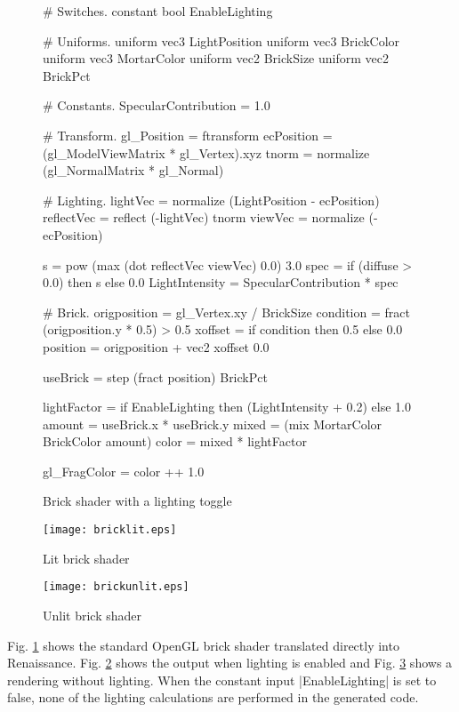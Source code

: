 \documentclass{acmsiggraph}               %
\begin{document}
\begin{figure}[htb]
\begin{MyVerb}
# Switches.
constant bool EnableLighting

# Uniforms.
uniform vec3 LightPosition
uniform vec3 BrickColor
uniform vec3 MortarColor
uniform vec2 BrickSize
uniform vec2 BrickPct

# Constants.
SpecularContribution = 1.0

# Transform.
gl_Position = ftransform
ecPosition = (gl_ModelViewMatrix * gl_Vertex).xyz
tnorm = normalize (gl_NormalMatrix * gl_Normal)

# Lighting.
lightVec   = normalize (LightPosition - ecPosition)
reflectVec = reflect (-lightVec) tnorm
viewVec    = normalize (-ecPosition)

s = pow (max (dot reflectVec viewVec) 0.0) 3.0
spec = if (diffuse > 0.0) then s else 0.0
LightIntensity = SpecularContribution * spec

# Brick.
origposition = gl_Vertex.xy / BrickSize
condition = fract (origposition.y * 0.5) > 0.5
xoffset = if condition then 0.5 else 0.0
position = origposition + vec2 xoffset 0.0

useBrick = step (fract position) BrickPct

lightFactor = if EnableLighting then
              (LightIntensity + 0.2) else 1.0
amount = useBrick.x * useBrick.y
mixed = (mix MortarColor BrickColor amount)
color = mixed * lightFactor

gl_FragColor = color ++ 1.0
\end{MyVerb}
\caption{Brick shader with a lighting toggle}
\label{BrickShader}
\end{figure}

\begin{figure}
\begin{center}
\texttt{[image: bricklit.eps]}
\caption{Lit brick shader}
\end{center}
\label{BrickLit}
\end{figure}

\begin{figure}
\begin{center}
\texttt{[image: brickunlit.eps]}
\caption{Unlit brick shader}
\end{center}
\label{BrickUnlit}
\end{figure}

Fig. \ref{BrickShader} shows the standard OpenGL brick shader
translated directly into Renaissance.  Fig. \ref{BrickLit} shows the
output when lighting is enabled and Fig. \ref{BrickUnlit} shows a
rendering without lighting.  When the constant input |EnableLighting|
is set to false, none of the lighting calculations are performed in
the generated code.
\end{document}
